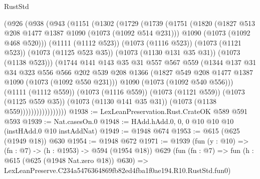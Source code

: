 \begin{lexlean}{RustStd}
\begin{coremodule}
                  (@926
                    (@938
                      (@943
                        (@1151
                          (@1302
                            (@1729
                              (@1739
                                (@1751
                                  (@1820
                                    (@1827 @513 @208 @1477 @1387 @1090 (@1073 (@1092 @514 @231)))
                                    @1090
                                    (@1073 (@1092 @468 @520)))
                                  (@1111 (@1112 @523))
                                  (@1073 (@1116 @523))
                                  (@1073 (@1121 @523))
                                  (@1073 (@1125 @523 @35))
                                  (@1073 (@1130 @131 @35 @31))
                                  (@1073 (@1138 @523)))
                                (@1744
                                  @141
                                  @143
                                  @35
                                  @31
                                  @557
                                  @567
                                  @559
                                  (@1344
                                    @137
                                    @31
                                    @34
                                    @323
                                    @556
                                    @566
                                    @202
                                    @539
                                    @208
                                    @1366
                                    (@1827 @549 @208 @1477 @1387 @1090 (@1073 (@1092 @550 @231)))
                                    @1090
                                    (@1073 (@1092 @540 @556)))
                                  (@1111 (@1112 @559))
                                  (@1073 (@1116 @559))
                                  (@1073 (@1121 @559))
                                  (@1073 (@1125 @559 @35))
                                  (@1073 (@1130 @141 @35 @31))
                                  (@1073 (@1138 @559)))))))))))))))))
@1938 := LexLeanPreservation.Rust.CrateOK @589 @591 @593
@1939 := Nat.casesOn.{0}
@1948 := HAdd.hAdd.{0, 0, 0} @10 @10 @10 (instHAdd.{0} @10 instAddNat)
@1949 := @1948 @674
@1953 := @615 (@625 (@1949 @18)) @630
@1954 := @1948 @672
@1971 := @1939
    (fun (y : @10) => (fn : @7) -> (h : @1953) -> @594 (@1954 @18))
    @629
    (fun (fn : @7) =>
    fun (h : @615 (@625 (@1948 Nat.zero @18)) @630) =>
    LexLeanPreserve.C234a5476364869fb82ed4fba1f0ae194.R10.RustStd.fun0)

\end{coremodule}
\end{lexlean}
